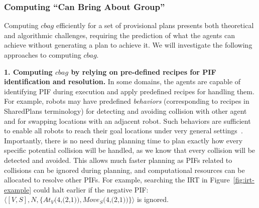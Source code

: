 \documentclass[11pt]{article}
\newcommand{\move}[3]{\textit{Move$_{#1}$(#2,#3)}}
\newcommand{\at}[3]{\textit{At$_{#1}$(#2,#3)}}
\begin{document}
\subsubsection{Computing ``Can Bring About Group''}
\label{sec:computing}
Computing $cbag$ efficiently for a set of provisional plans presents both theoretical and algorithmic challenges, requiring the prediction of what the agents can achieve without generating a plan to achieve it. We will investigate the following approaches to computing $cbag$. 

{\bf 1. Computing $cbag$ by relying on pre-defined recipes for PIF identification and resolution.} 
In some domains, the agents are capable of identifying PIF during execution and apply predefined recipes for handling them. 
For example, robots may have predefined {\em behaviors} (corresponding to recipes in SharedPlans terminology) for detecting and avoiding collision with other agent and for swapping locations with an adjacent robot. Such behaviors are sufficient to enable all robots to reach their goal locations under very general settings~\cite{wang2009tractable,snape2011hybrid,de2013push}. Importantly, there is no need during planning time to plan exactly how every specific potential collision will be handled, as we know that every collision will be detected and avoided. This allows much faster planning as PIFs related to collisions can be ignored during planning, and computational resources can be allocated to resolve other PIFs. For example, searching the IRT in Figure~\ref{fig:irt-example} could halt earlier if the negative PIF: $\langle [V,S], N, \{ \at{V}{4}{(2,1)}, \move{S}{4}{(2,1)} \} \rangle$ is ignored.


\end{document}
